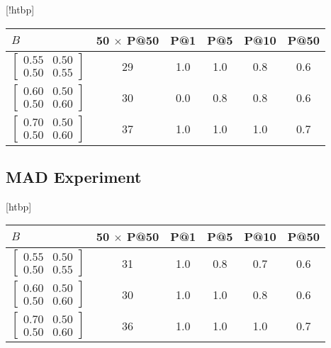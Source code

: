 \documentclass{tufte-handout}
\makeatletter
\renewenvironment{table}[1][htbp]{%
\@tufte@orig@float{table}[#1]}{%
\@tufte@orig@endfloat}%
\makeatother
\begin{document}
\begin{table}[!htbp]
  \begin{tabular}{l c c c c c}
    $B$ & 50 $\times$ P@50 & P@1 & P@5 & P@10 & P@50 \\ \toprule
  $\begin{bmatrix} 0.55 & 0.50 \\0.50 &0.55 \end{bmatrix}$ & 29 & 1.0 & 1.0 & 0.8 & 0.6 \\
  $\begin{bmatrix} 0.60 & 0.50 \\0.50 &0.60 \end{bmatrix}$ & 30 & 0.0 & 0.8 & 0.8 & 0.6 \\
  $\begin{bmatrix} 0.70 & 0.50 \\0.50 &0.60 \end{bmatrix}$ & 37 & 1.0 & 1.0 & 1.0 & 0.7 \\
  \end{tabular}
\caption{Performance vs B Matrix. RESCAL Algorithm. Seed=1234, Undirected, Training Size=20}
\label{tab:perf-vs-b}
\end{table}

\pagebreak
\subsection{MAD Experiment}
\label{sec:mad-experiment}
\begin{table}[htbp]
  \begin{tabular}{l c c c c c}
    $B$ & 50 $\times$ P@50 & P@1 & P@5 & P@10 & P@50 \\ \toprule
  $\begin{bmatrix} 0.55 & 0.50 \\0.50 &0.55 \end{bmatrix}$ & 31 & 1.0 & 0.8 & 0.7 & 0.6 \\
  $\begin{bmatrix} 0.60 & 0.50 \\0.50 &0.60 \end{bmatrix}$ & 30 & 1.0 & 1.0 & 0.8 & 0.6 \\
  $\begin{bmatrix} 0.70 & 0.50 \\0.50 &0.60 \end{bmatrix}$ & 36 & 1.0 & 1.0 & 1.0 & 0.7 \\
  \end{tabular}
  \caption{Performance vs B Matrix. MAD Algorithm. Seed=0, Directed, Training Size=20}
  \label{tab:perf-vs-b-4}
\end{table}
\end{document}
